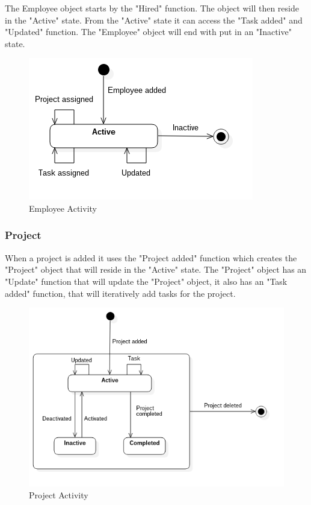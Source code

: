 The Employee object starts by the "Hired" function. The object will then reside in the "Active" state. From the "Active" state it can access the "Task added" and "Updated" function. The "Employee" object will end with put in an "Inactive" state. %

\begin{figure}[H]
    \centering
    \includegraphics[scale=0.6]{Images/ProblemDomain/employeeActivityDiagram.png}
    \caption{Employee Activity}
    \label{fig:employeeActivityDiagram}
\end{figure}

\subsubsection*{Project}

When a project is added it uses the "Project added" function which creates the "Project" object that will reside in the "Active" state. The "Project" object has an "Update" function that will update the "Project" object, it also has an "Task added" function, that will iteratively add tasks for the project.

\begin{figure}[H]
    \centering
    \includegraphics[scale=0.4]{Images/ProblemDomain/projectActivityDiagram.png}
    \caption{Project Activity}
    \label{fig:projectActivityDiagram}
\end{figure}

